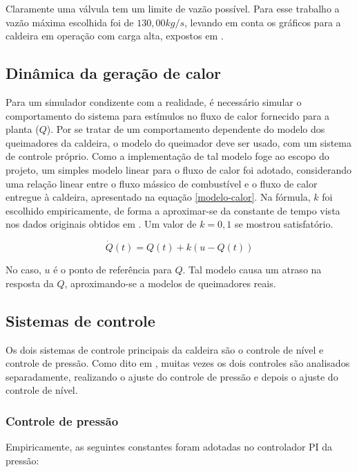Claramente uma válvula tem um limite de vazão possível. Para esse
trabalho a vazão máxima escolhida foi de $130,00 kg/s$, levando em
conta os gráficos para a caldeira em operação com carga alta, expostos
em .

\subsection{Dinâmica da geração de calor}

Para um simulador condizente com a realidade, é necessário simular o
comportamento do sistema para estímulos no fluxo de calor fornecido
para a planta ($Q$). Por se tratar de um comportamento dependente do
modelo dos queimadores da caldeira, o modelo do queimador deve ser
usado, com um sistema de controle próprio. Como a implementação de tal
modelo foge ao escopo do projeto, um simples modelo linear para o
fluxo de calor foi adotado, considerando uma relação linear entre o
fluxo mássico de combustível e o fluxo de calor entregue à caldeira,
apresentado na equação \ref{modelo-calor}. Na fórmula, $k$ foi
escolhido empiricamente, de forma a aproximar-se da constante de tempo
vista nos dados originais obtidos em . Um valor de
$k = 0,1$ se mostrou satisfatório.

\begin{equation}
  \dot{Q}(t) = Q(t) + k(u - Q(t))
  \label{modelo-calor}
\end{equation}

No caso, $u$ é o ponto de referência para $Q$. Tal modelo causa um
atraso na resposta da $Q$, aproximando-se a modelos de queimadores
reais.

\subsection{Sistemas de controle}

Os dois sistemas de controle principais da caldeira são o controle de
nível e controle de pressão. Como dito em , muitas
vezes os dois controles são analisados separadamente, realizando o
ajuste do controle de pressão e depois o ajuste do controle de nível.

\subsubsection{Controle de pressão}

Empiricamente, as seguintes constantes foram adotadas no controlador
PI da pressão:

